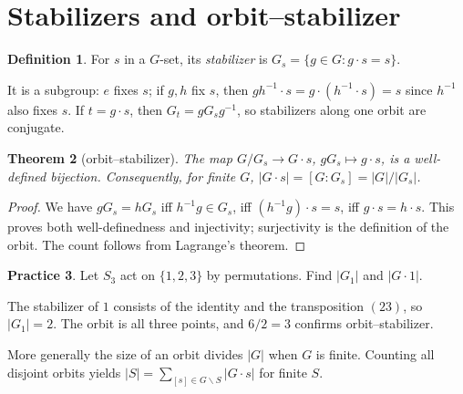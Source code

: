 \documentclass[11pt,openany]{book}
\newtheorem{theorem}{Theorem}[chapter]
\theoremstyle{definition}
\newtheorem{definition}[theorem]{Definition}
\newtheorem{exercise}[theorem]{Practice}
\begin{document}
\section{Stabilizers and orbit--stabilizer}
\begin{definition}For $s$ in a $G$-set, its \emph{stabilizer} is $G_s=\{g\in G:g\cdot s=s\}$.\end{definition}
It is a subgroup: $e$ fixes $s$; if $g,h$ fix $s$, then $gh^{-1}\cdot s=g\cdot(h^{-1}\cdot s)=s$ since $h^{-1}$ also fixes $s$. If $t=g\cdot s$, then $G_t=gG_sg^{-1}$, so stabilizers along one orbit are conjugate.
\begin{theorem}[orbit--stabilizer]The map $G/G_s\to G\cdot s$, $gG_s\mapsto g\cdot s$, is a well-defined bijection. Consequently, for finite $G$, $|G\cdot s|=[G:G_s]=|G|/|G_s|$.\end{theorem}
\begin{proof}We have $gG_s=hG_s$ iff $h^{-1}g\in G_s$, iff $(h^{-1}g)\cdot s=s$, iff $g\cdot s=h\cdot s$. This proves both well-definedness and injectivity; surjectivity is the definition of the orbit. The count follows from Lagrange's theorem.\end{proof}
\begin{exercise}Let $S_3$ act on $\{1,2,3\}$ by permutations. Find $|G_1|$ and $|G\cdot1|$.\end{exercise}
\begin{solution}The stabilizer of $1$ consists of the identity and the transposition $(23)$, so $|G_1|=2$. The orbit is all three points, and $6/2=3$ confirms orbit--stabilizer.\end{solution}
More generally the size of an orbit divides $|G|$ when $G$ is finite. Counting all disjoint orbits yields $|S|=\sum_{[s]\in G\backslash S}|G\cdot s|$ for finite $S$.
\end{document}
